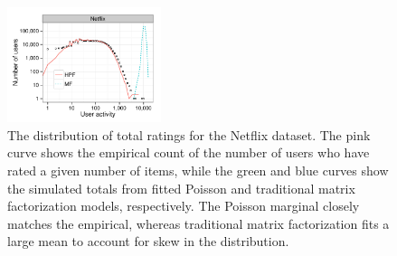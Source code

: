 






\begin{figure}[t!]
  \centering
  \includegraphics[width=0.4\textwidth]{figures/user_activity_sim_netflix.pdf}
  \caption{The distribution of total ratings for the Netflix dataset.
    The pink curve shows the empirical count of the number of users
    who have rated a given number of items, while the green and blue
    curves show the simulated totals from fitted Poisson and
    traditional matrix factorization models, respectively. The Poisson
    marginal closely matches the empirical, whereas traditional matrix
    factorization fits a large mean to account for skew in the
    distribution.}
\label{fig:marginals}
\end{figure}

